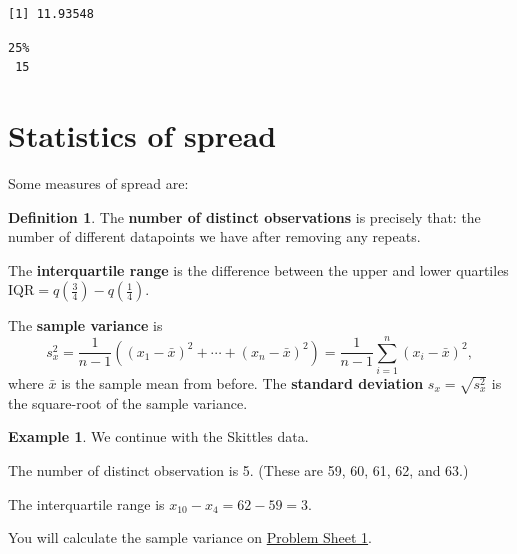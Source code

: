 \documentclass[
  a4paper,
]{book}
\newenvironment{Shaded}{\begin{snugshade}}{\end{snugshade}}
\newcommand{\AttributeTok}[1]{\textcolor[rgb]{0.77,0.63,0.00}{#1}}
\newcommand{\DecValTok}[1]{\textcolor[rgb]{0.00,0.00,0.81}{#1}}
\newcommand{\FunctionTok}[1]{\textcolor[rgb]{0.00,0.00,0.00}{#1}}
\newcommand{\NormalTok}[1]{#1}
\newcommand{\SpecialCharTok}[1]{\textcolor[rgb]{0.00,0.00,0.00}{#1}}
\theoremstyle{definition}
\newtheorem{definition}{Definition}[chapter]
\theoremstyle{definition}
\newtheorem{example}{Example}[chapter]
\theoremstyle{definition}
\theoremstyle{definition}
\theoremstyle{remark}
\begin{document}
\begin{verbatim}
[1] 11.93548
\end{verbatim}

\begin{Shaded}
\end{Shaded}

\begin{verbatim}
25% 
 15 
\end{verbatim}

\hypertarget{stat-spread}{%
\section{Statistics of spread}\label{stat-spread}}

Some measures of spread are:

\begin{definition}
The \textbf{number of distinct observations} is precisely that: the number of different datapoints we have after removing any repeats.

The \textbf{interquartile range} is the difference between the upper and lower quartiles \(\text{IQR} = q(\frac34) - q(\frac14)\).

The \textbf{sample variance} is
\[  s^2_x = \frac{1}{n-1} \left((x_1 - \bar x)^2 + \cdots + (x_n - \bar x)^2 \right) = \frac{1}{n-1} \sum_{i=1}^n (x_i - \bar x)^2 , \]
where \(\bar x\) is the sample mean from before. The \textbf{standard deviation} \(s_x = \sqrt{s^2_x}\) is the square-root of the sample variance.
\end{definition}

\begin{example}
We continue with the Skittles data.

The number of distinct observation is 5. (These are 59, 60, 61, 62, and 63.)

The interquartile range is \(x_{10} - x_4 = 62 - 59 = 3\).

You will calculate the sample variance on \protect\hyperlink{P1}{Problem Sheet 1}.
\end{example}
\end{document}
